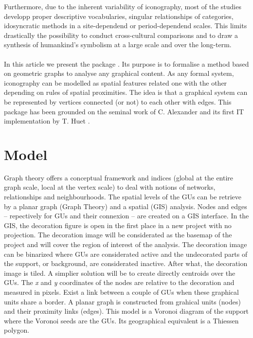 \documentclass[article]{jss}
\begin{document}
Furthermore, due to the inherent variability of iconography, most of the studies developp proper descriptive vocabularies, singular relationships of categories, idosyncratic methods in a site-dependend or period-dependend scales. This limits drastically the possibility to conduct cross-cultural comparisons and to draw a synthesis of humankind's symbolism at a large scale and over the long-term. 
\\
\\
In this article we present the  package . Its purpose is to formalise a method based on geometric graphs to analyse any graphical content. As any formal system, iconography can be modelled as spatial features related one with the other depending on rules of spatial proximities. The idea is that a graphical system can be represented by vertices connected (or not) to each other with edges. This package has been grounded on the seminal work of C. Alexander \citep{Alexander08} and its first IT implementation by T. Huet \citep{Huet18a}. 

\section[Model]{Model} \label{sec:model}

Graph theory offers a conceptual framework and indices (global at the entire graph scale, local at the vertex scale) to deal with notions of networks, relationships and neighbourhoods. The spatial levels of the GUs can be retrieve by a planar graph (Graph Theory) and a spatial (GIS) analysis.
Nodes and edges -- repectively for GUs and their connexion -- are created on a GIS interface. 
In the GIS, the decoration figure is open in the first place in a new project with no projection. The decoration image will be considerated as the basemap of the project and will cover the region of interest of the analysis. The decoration image can be binarized where GUs are considerated active and the undecorated parts of the support, or background, are considerated inactive. After what, the decoration image is tiled. A simplier solution will be to create directly centroids over the GUs. The \emph{x} and \emph{y} coordinates of the nodes are relative to the decoration and measured in pixels.
Exist a link between a couple of GUs when these graphical units share a border. A planar graph is constructed from grahical units (nodes) and their proximity links (edges). This model is a Voronoi diagram of the support where the Voronoi seeds are the GUs. Its geographical equivalent is a Thiessen polygon.
\end{document}
